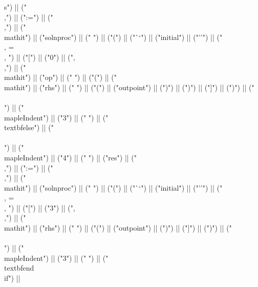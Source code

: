 \documentclass{article}
\begin{document}
\begin{center}
\begin{maplelatex}
{s") || ("\\,") || (":=") || ("\\,") || ("\\mathit{") || ("solnproc") || ("} ") || ("(") || ("``") || ("initial") || ("''") || (" \\, = \\, ") || ("[") || ("0") || (",\\,") || ("\\mathit{") || ("op") || ("} ") || ("(") || ("\\mathit{") || ("rhs") || ("} ") || ("(") || ("outpoint") || (")") || (")") || ("]") || (")") || ("\\\\\n") || ("\\mapleIndent{") || ("3") || ("} ") || ("\\textbf{else}") || ("\\\\\n") || ("\\mapleIndent{") || ("4") || ("} ") || ("res") || ("\\,") || (":=") || ("\\,") || ("\\mathit{") || ("solnproc") || ("} ") || ("(") || ("``") || ("initial") || ("''") || (" \\, = \\, ") || ("[") || ("3") || (",\\,") || ("\\mathit{") || ("rhs") || ("} ") || ("(") || ("outpoint") || (")") || ("]") || (")") || ("\\\\\n") || ("\\mapleIndent{") || ("3") || ("} ") || ("\\textbf{end\\ if}") ||}
\end{maplelatex}
\end{center}
\end{document}
